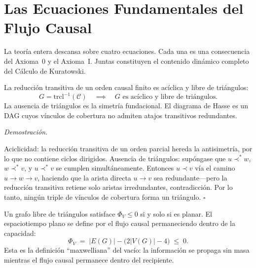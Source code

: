 \documentclass[11pt, a4paper, openany]{book}
\newcommand{\covers}{\prec^{\!*}}
\renewenvironment{proof}[1][Demostraci\'on]{%
  \par\noindent\textit{#1.}\quad
}{\hfill$\square$\par\medskip}
\begin{document}
\section{Las Ecuaciones Fundamentales del Flujo Causal}
\label{sec:fundamental-equations}

La teor\'ia entera descansa sobre cuatro ecuaciones. Cada una es una
consecuencia del Axioma~0 y el Axioma~I. Juntas constituyen el contenido
din\'amico completo del C\'alculo de Kuratowski.

\begin{theorem}
\label{thm:law-of-causality}
La reducci\'on transitiva de un orden causal finito es ac\'iclica y
libre de tri\'angulos:
\begin{equation}
\label{eq:law-of-causality}
  G = \mathrm{trcl}^{-1}(\mathcal{C})
  \quad\implies\quad
  G \text{ es ac\'iclico y libre de tri\'angulos.}
\end{equation}
La ausencia de tri\'angulos es la simetr\'ia fundacional. El diagrama
de Hasse es un DAG cuyos v\'inculos de cobertura no admiten atajos
transitivos redundantes.
\end{theorem}

\begin{proof}
Aciclicidad: la reducci\'on transitiva de un orden parcial hereda la
antisimetr\'ia, por lo que no contiene ciclos dirigidos.
Ausencia de tri\'angulos: sup\'ongase que $u \covers w$, $w \covers v$,
y $u \covers v$ se cumplen simult\'aneamente. Entonces $u \prec v$
v\'ia el camino $u \to w \to v$, haciendo que la arista directa
$u \to v$ sea redundante---pero la reducci\'on transitiva retiene solo
aristas irredundantes, contradicci\'on. Por lo tanto, ning\'un triple
de v\'inculos de cobertura forma un tri\'angulo.
\end{proof}

\begin{theorem}
\label{thm:volumetric-limit-eq}
Un grafo libre de tri\'angulos satisface $\Phi_V \leq 0$ si y solo si
es planar. El espaciotiempo plano se define por el flujo causal
permaneciendo dentro de la capacidad:
\begin{equation}
\label{eq:volumetric-limit-eq}
  \Phi_V \;=\; |E(G)| - \bigl(2|V(G)| - 4\bigr) \;\leq\; 0.
\end{equation}
Esta es la definici\'on ``maxwelliana'' del vac\'io: la informaci\'on
se propaga sin masa mientras el flujo causal permanece dentro del
recipiente.
\end{theorem}
\end{document}
